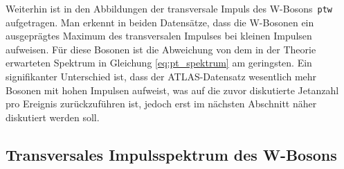 \documentclass[11pt, a4paper]{article}
\numberwithin{equation}{section}
\begin{document}
Weiterhin ist in den Abbildungen der transversale Impuls des W-Bosons~\texttt{ptw} aufgetragen.
Man erkennt in beiden Datensätze, dass die W-Bosonen ein ausgeprägtes Maximum des transversalen Impulses bei kleinen Impulsen aufweisen.
Für diese Bosonen ist die Abweichung von dem in der Theorie erwarteten Spektrum in Gleichung \eqref{eq:pt_spektrum} am geringsten.
Ein signifikanter Unterschied ist, dass der ATLAS-Datensatz wesentlich mehr Bosonen mit hohen Impulsen aufweist, was auf die zuvor diskutierte Jetanzahl pro Ereignis zurückzuführen ist, jedoch erst im nächsten Abschnitt näher diskutiert werden soll.

\clearpage
\subsection{Transversales Impulsspektrum des W-Bosons}
\label{ssec:ptw_spektrum}
\end{document}
